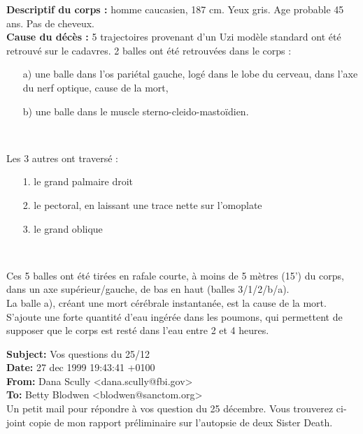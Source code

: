 \documentclass[11pt,twoside,a4paper]{book}
\begin{document}
\textbf{Descriptif du corps : }homme caucasien, 187 cm. Yeux gris. Age probable 45 ans. Pas de cheveux. ~\\

\textbf{Cause du d{\'e}c{\`e}s : }5 trajectoires provenant d'un Uzi mod{\`e}le standard ont {\'e}t{\'e} retrouv{\'e} sur le cadavres. 2 balles ont {\'e}t{\'e} retrouv{\'e}es dans le corps : 
\setlength\parindent{20pt}
\begin{itemize}
	\item[a)] une balle dans l'os pari{\'e}tal gauche, log{\'e} dans le lobe du cerveau, dans l'axe du nerf optique, cause de la mort,
	\item[b)]une balle dans le muscle sterno-cleido-masto{\"i}dien. 
\end{itemize}~\\
\setlength\parindent{0pt}

Les 3 autres ont travers{\'e} :
\setlength\parindent{20pt}
\begin{itemize}
	\item[1.] le grand palmaire droit
	\item[2.] le pectoral, en laissant une trace nette sur l'omoplate
	\item[3.] le grand oblique
\end{itemize}~\\
\setlength\parindent{0pt}

Ces 5 balles ont {\'e}t{\'e} tir{\'e}es en rafale courte, {\`a} moins de 5 m{\`e}tres (15') du corps, dans un axe sup{\'e}rieur/gauche, de bas en haut (balles 3/1/2/b/a). ~\\

La balle a), cr{\'e}ant une mort c{\'e}r{\'e}brale instantan{\'e}e, est la cause de la mort. S'ajoute une forte quantit{\'e} d'eau ing{\'e}r{\'e}e dans les poumons, qui permettent de supposer que le corps est rest{\'e} dans l'eau entre 2 et 4 heures. ~\\

\clearpage

\textbf{Subject: }Vos questions du 25/12~\\
\textbf{Date: }27 dec 1999 19:43:41 +0100~\\
\textbf{From: }Dana Scully <dana.scully@fbi.gov>~\\
\textbf{To: }Betty Blodwen <blodwen@sanctom.org>~\\

Un petit mail pour r{\'e}pondre {\`a} vos question du 25 d{\'e}cembre. Vous trouverez ci-joint copie de mon rapport pr{\'e}liminaire sur l'autopsie de deux Sister Death. ~\\
\end{document}
